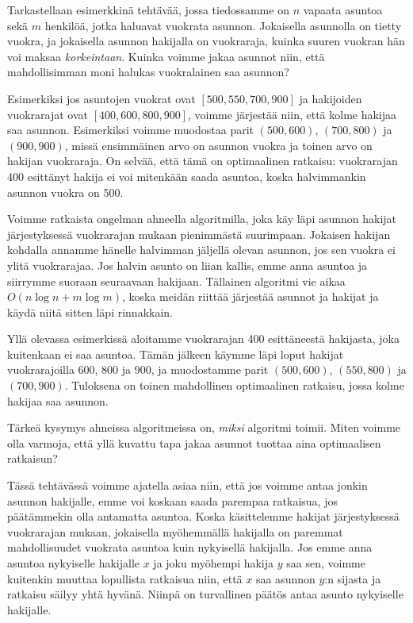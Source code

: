 Tarkastellaan esimerkkinä tehtävää, jossa tiedossamme on
$n$ vapaata asuntoa sekä $m$ henkilöä, jotka haluavat vuokrata asunnon.
Jokaisella asunnolla on tietty vuokra,
ja jokaisella asunnon hakijalla on vuokraraja,
kuinka suuren vuokran hän voi maksaa \emph{korkeintaan}.
Kuinka voimme jakaa asunnot niin, että mahdollisimman moni
halukas vuokralainen saa asunnon?

Esimerkiksi jos asuntojen vuokrat ovat $[500,550,700,900]$
ja hakijoiden vuokrarajat ovat $[400,600,800,900]$,
voimme järjestää niin, että kolme hakijaa saa asunnon.
Esimerkiksi voimme muodostaa parit $(500,600)$, $(700,800)$
ja $(900,900)$, missä ensimmäinen arvo on asunnon vuokra
ja toinen arvo on hakijan vuokraraja.
On selvää, että tämä on optimaalinen ratkaisu:
vuokrarajan 400 esittänyt hakija ei voi mitenkään saada asuntoa,
koska halvimmankin asunnon vuokra on 500.

Voimme ratkaista ongelman ahneella algoritmilla,
joka käy läpi asunnon hakijat järjestyksessä vuokrarajan
mukaan pienimmästä suurimpaan.
Jokaisen hakijan kohdalla annamme hänelle halvimman
jäljellä olevan asunnon, jos sen vuokra ei ylitä vuokrarajaa.
Jos halvin asunto on liian kallis, emme anna asuntoa ja
siirrymme suoraan seuraavaan hakijaan.
Tällainen algoritmi vie aikaa $O(n \log n + m \log m)$,
koska meidän riittää järjestää asunnot ja hakijat
ja käydä niitä sitten läpi rinnakkain.

Yllä olevassa esimerkissä aloitamme vuokrarajan 400
esittäneestä hakijasta, joka kuitenkaan ei saa asuntoa.
Tämän jälkeen käymme läpi loput hakijat
vuokrarajoilla 600, 800 ja 900, ja muodostamme parit
$(500,600)$, $(550,800)$ ja $(700,900)$.
Tuloksena on toinen mahdollinen optimaalinen ratkaisu,
jossa kolme hakijaa saa asunnon.

Tärkeä kysymys ahneissa algoritmeissa on, \emph{miksi}
algoritmi toimii. Miten voimme olla varmoja, että yllä kuvattu tapa
jakaa asunnot tuottaa aina optimaalisen ratkaisun?

Tässä tehtävässä voimme ajatella asiaa niin,
että jos voimme antaa jonkin asunnon hakijalle,
emme voi koskaan saada parempaa ratkaisua,
jos päätämmekin olla antamatta asuntoa.
Koska käsittelemme hakijat järjestyk\-sessä vuokrarajan mukaan,
jokaisella myöhemmällä hakijalla on paremmat mahdollisuudet
vuokrata asuntoa kuin nykyisellä hakijalla.
Jos emme anna asuntoa nykyiselle hakijalle $x$
ja joku myöhempi hakija $y$ saa sen, voimme kuitenkin 
muuttaa lopullista ratkaisua niin, että $x$
saa asunnon $y$:n sijasta ja ratkaisu säilyy yhtä hyvänä.
Niinpä on turvallinen päätös antaa asunto nykyiselle hakijalle.